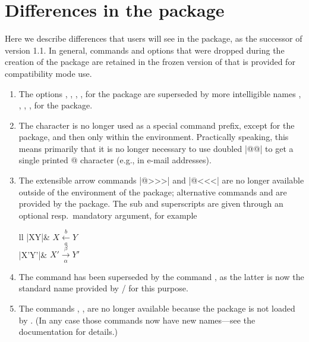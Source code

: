 \documentclass{amsdtx}
\begin{document}
\section{Differences in the  package}

Here we describe differences that users will see in the 
package, as the successor of  version 1.1. In general,
commands and options that were dropped during the creation of the
 package are retained in the frozen version of 
that is provided for compatibility mode use.

\begin{enumerate}

\item The options , , ,
,  for the  package are
superseded by more intelligible names ,
, , ,  for
the  package.

\item The \qc{\@} character is no longer used as a special command
prefix, except for the  package, and then only within the
 environment. Practically speaking, this means primarily that it
is no longer necessary to use doubled |@@| to get a single printed @
character (e.g., in e-mail addresses).

\item The extensible arrow commands |@>>>| and |@<<<| are no longer
available outside of the  environment of the 
package; alternative commands  and  are
provided by the  package. The sub and superscripts are
given through an optional resp.\ mandatory argument, for example
\begin{ctab}{ll}
|XY|& $X\xleftarrow[a]{b}Y$\\
|X'\xrightarrow[\alpha]{\beta}Y'|& $X'\xrightarrow[\alpha]{\beta}Y'$
\end{ctab}

\item The command  has been superseded by the command
, as the latter is now the standard name provided by \latex/
for this purpose.

\item The commands , ,  are no longer
available because the  package is not loaded by
. (In any case those commands now have new names---see the
 documentation for details.)


\end{enumerate}
\end{document}
